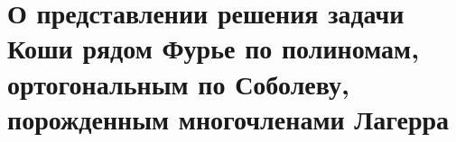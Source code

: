 \chapter{О представлении решения задачи Коши  рядом Фурье  по полиномам, ортогональным по  Соболеву, порожденным многочленами Лагерра}


